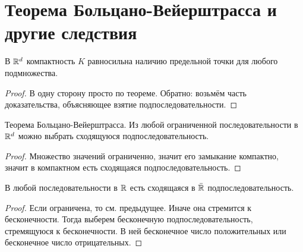 \section{Теорема Больцано-Вейерштрасса и другие следствия}
\begin{conseq}
В $\mathbb{R}^d$ компактность $K$ равносильна наличию предельной точки для любого подмножества.  
\end{conseq}
\begin{proof}
В одну сторону просто по теореме.
Обратно: возьмём часть доказательства, объясняющее взятие подпоследовательности.
\end{proof}

\begin{conseq}{Теорема Больцано-Вейерштрасса.}
Из любой ограниченной последовательности в $\mathbb{R}^d$ можно выбрать сходящуюся подпоследовательность.
\end{conseq}
\begin{proof}
Множество значений ограниченно, значит его замыкание компактно, значит в компактном есть сходящаяся подпоследовательность.
\end{proof}

\begin{conseq}
В любой последовательности в $\mathbb{R}$ есть сходящаяся в $\bar {\mathbb{R}}$ подпоследовательность.
\end{conseq}
\begin{proof}
Если ограничена, то см. предыдущее. Иначе она стремится к бесконечности. Тогда выберем бесконечную подпоследовательность, стремящуюся к бесконечности. В ней бесконечное число положительных или бесконечное число отрицательных.
\end{proof}